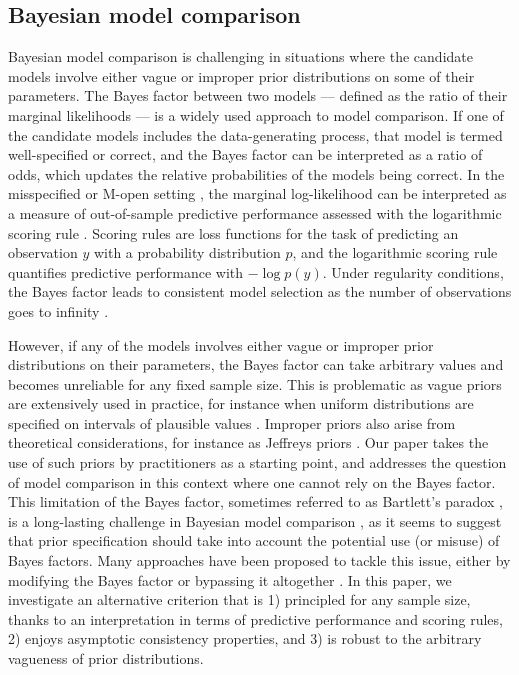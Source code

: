 \documentclass[12pt]{article}
\theoremstyle{plain}
\theoremstyle{definition}
\begin{document}
	\subsection{Bayesian model comparison}
	Bayesian model comparison is challenging in situations where the candidate models
	involve either vague or improper prior distributions on some of their
	parameters. The Bayes factor \citep{jeffrey1939} between two models --- defined as the
	ratio of their marginal likelihoods ---  is a widely used approach to model comparison.
	If one of the candidate models includes the data-generating process, that model is termed well-specified or correct,
	and the Bayes factor can be interpreted as a ratio of odds, which updates the relative probabilities of the models being correct.
	In the misspecified or M-open setting \citep[][]{bernardo:smith:2000}, the marginal log-likelihood can be interpreted
	as a measure of out-of-sample predictive performance assessed with the logarithmic scoring rule
	\citep[e.g.][]{kassraftery1995,key1999,bernardo:smith:2000}. Scoring rules are loss functions
	for the task of predicting an observation $y$ with a probability distribution $p$, and the logarithmic 
	scoring rule quantifies predictive performance with $-\log p(y)$.
	Under regularity conditions, the Bayes factor leads to consistent
	model selection as the number of observations goes to infinity \citep[e.g.][]{dawid2011,lee2011consistency,walker2013bayesian,chib2016}.
	
	However, if any of the  models involves either vague or improper prior
	distributions on their parameters, the Bayes factor can take arbitrary values
	and becomes unreliable for any fixed sample size. This is problematic
	as vague priors are extensively used in practice,
	for instance when uniform distributions are specified on intervals of plausible values
	\citep[e.g.\!][see Section \ref{example:applicationsKangaroos}]{knape2012}.
	Improper priors also arise 
	from theoretical considerations, for instance
	as Jeffreys priors \citep[e.g.\! Chapter 3 of][]{robert2007bayesian}. Our paper takes the use of such priors by practitioners as a starting point, and addresses the question of model comparison in this context where one cannot rely on the Bayes factor.
	This limitation of the Bayes factor, sometimes
	referred to as Bartlett's paradox \citep{bartlett1957,kassraftery1995}, is a
	long-lasting challenge in Bayesian model comparison \citep[Chapter 7 of][]{robert2007bayesian},
	as it seems to suggest that prior specification should take into account the potential use (or misuse) of Bayes factors. Many approaches have been
	proposed to tackle this issue, either by modifying the Bayes factor 
	\citep[e.g.\!][]{ohagan1995,bergerPericchi1996,bergerPericchi1998,bergerPericchi2001}
	or bypassing it altogether
	\citep[e.g.\!][and references therein]{kamary:mengersen:robert:rousseau2014}.
	In this paper, we
	investigate an alternative criterion that is 1) principled for any sample size, thanks to an interpretation  in terms of predictive performance and scoring rules,
	2) enjoys asymptotic consistency properties, and 3) is robust to the arbitrary vagueness of prior distributions.
	
\end{document}
